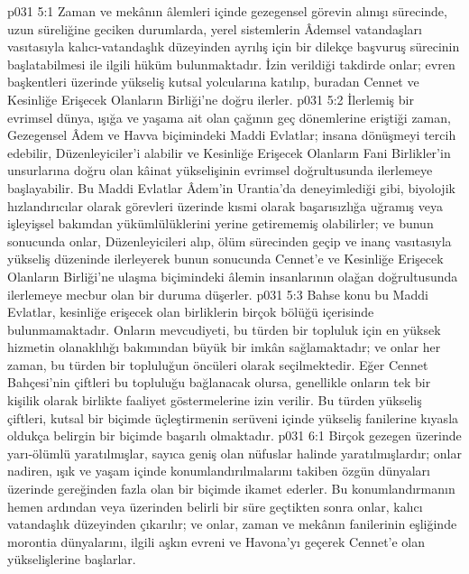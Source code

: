 \vs p031 5:1 Zaman ve mekânın âlemleri içinde gezegensel görevin alınışı sürecinde, uzun süreliğine geciken durumlarda, yerel sistemlerin Âdemsel vatandaşları vasıtasıyla kalıcı\hyp{}vatandaşlık düzeyinden ayrılış için bir dilekçe başvuruş sürecinin başlatabilmesi ile ilgili hüküm bulunmaktadır. İzin verildiği takdirde onlar; evren başkentleri üzerinde yükseliş kutsal yolcularına katılıp, buradan Cennet ve Kesinliğe Erişecek Olanların Birliği’ne doğru ilerler.
\vs p031 5:2 İlerlemiş bir evrimsel dünya, ışığa ve yaşama ait olan çağının geç dönemlerine eriştiği zaman, Gezegensel Âdem ve Havva biçimindeki Maddi Evlatlar; insana dönüşmeyi tercih edebilir, Düzenleyiciler’i alabilir ve Kesinliğe Erişecek Olanların Fani Birlikler’in unsurlarına doğru olan kâinat yükselişinin evrimsel doğrultusunda ilerlemeye başlayabilir. Bu Maddi Evlatlar Âdem’in Urantia’da deneyimlediği gibi, biyolojik hızlandırıcılar olarak görevleri üzerinde kısmi olarak başarısızlığa uğramış veya işleyişsel bakımdan yükümlülüklerini yerine getirememiş olabilirler; ve bunun sonucunda onlar, Düzenleyicileri alıp, ölüm sürecinden geçip ve inanç vasıtasıyla yükseliş düzeninde ilerleyerek bunun sonucunda Cennet’e ve Kesinliğe Erişecek Olanların Birliği’ne ulaşma biçimindeki âlemin insanlarının olağan doğrultusunda ilerlemeye mecbur olan bir duruma düşerler.
\vs p031 5:3 Bahse konu bu Maddi Evlatlar, kesinliğe erişecek olan birliklerin birçok bölüğü içerisinde bulunmamaktadır. Onların mevcudiyeti, bu türden bir topluluk için en yüksek hizmetin olanaklılığı bakımından büyük bir imkân sağlamaktadır; ve onlar her zaman, bu türden bir topluluğun öncüleri olarak seçilmektedir. Eğer Cennet Bahçesi’nin çiftleri bu topluluğu bağlanacak olursa, genellikle onların tek bir kişilik olarak birlikte faaliyet göstermelerine izin verilir. Bu türden yükseliş çiftleri, kutsal bir biçimde üçleştirmenin serüveni içinde yükseliş fanilerine kıyasla oldukça belirgin bir biçimde başarılı olmaktadır.
\vs p031 6:1 Birçok gezegen üzerinde yarı\hyp{}ölümlü yaratılmışlar, sayıca geniş olan nüfuslar halinde yaratılmışlardır; onlar nadiren, ışık ve yaşam içinde konumlandırılmalarını takiben özgün dünyaları üzerinde gereğinden fazla olan bir biçimde ikamet ederler. Bu konumlandırmanın hemen ardından veya üzerinden belirli bir süre geçtikten sonra onlar, kalıcı vatandaşlık düzeyinden çıkarılır; ve onlar, zaman ve mekânın fanilerinin eşliğinde morontia dünyalarını, ilgili aşkın evreni ve Havona’yı geçerek Cennet’e olan yükselişlerine başlarlar.
